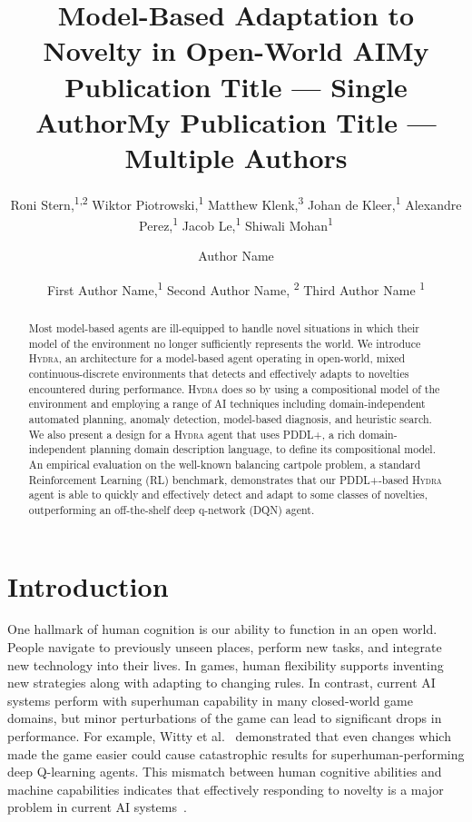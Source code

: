 \documentclass[letterpaper]{article} %
\title{Model-Based Adaptation to Novelty in Open-World AI}
\author{
    Roni Stern,\textsuperscript{\rm 1,2}\equalcontrib
    Wiktor Piotrowski,\textsuperscript{\rm 1}\equalcontrib
    Matthew Klenk,\textsuperscript{\rm 3}\equalcontrib
    Johan de Kleer,\textsuperscript{\rm 1}
    Alexandre Perez,\textsuperscript{\rm 1}
    Jacob Le,\textsuperscript{\rm 1} 
    Shiwali Mohan\textsuperscript{\rm 1} \equalcontrib
}
\title{My Publication Title --- Single Author}
\author {
    Author Name
}
\title{My Publication Title --- Multiple Authors}
\author {
    First Author Name,\textsuperscript{\rm 1}
    Second Author Name, \textsuperscript{\rm 2}
    Third Author Name \textsuperscript{\rm 1}
}
\newcommand{\hydra}{\textsc{Hydra}\xspace} %
\begin{document}
\maketitle

\begin{abstract}
Most model-based agents are ill-equipped to handle novel situations in which their model of the environment no longer sufficiently represents the world. 
We introduce \hydra, an architecture for a model-based agent operating in open-world, mixed continuous-discrete environments that detects and effectively adapts to novelties encountered during performance. 
\hydra does so by using a compositional model of the environment and employing a range of AI techniques including domain-independent automated planning, anomaly detection, model-based diagnosis, and heuristic search. We also present a design for a \hydra agent that uses PDDL+, a rich domain-independent planning domain description language, to define its compositional model. 
An empirical evaluation on the well-known balancing cartpole problem, a standard Reinforcement Learning (RL) benchmark, demonstrates that our PDDL+-based \hydra agent is able to quickly and effectively detect and adapt to some classes of novelties, outperforming an off-the-shelf deep q-network (DQN) agent. 
\end{abstract}


\section{Introduction}





One hallmark of human cognition is our ability to function in an open world. 
People navigate to previously unseen places, perform new tasks, and integrate new technology into their lives. In games, human flexibility supports inventing new strategies along with adapting to changing rules. 
In contrast, current AI systems perform with superhuman capability in many closed-world game domains, but minor perturbations of the game can lead to significant drops in performance. 
For example, Witty et al.~ demonstrated that even changes which made the game easier could cause catastrophic results for superhuman-performing deep Q-learning agents. 
This mismatch between human cognitive abilities and machine capabilities indicates that effectively responding to novelty is a major problem in current AI systems~\cite{senator2019sailon}. 
\end{document}
